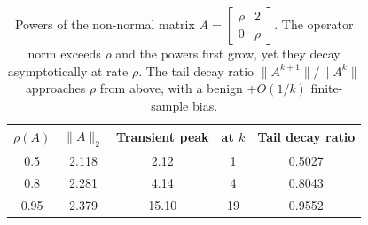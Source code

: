 \begin{table}[h]
\centering
\caption{Powers of the non-normal matrix $A = \left[\begin{smallmatrix} \rho & 2 \\ 0 & \rho \end{smallmatrix}\right]$. The operator norm exceeds $\rho$ and the powers first grow, yet they decay asymptotically at rate $\rho$. The tail decay ratio $\|A^{k+1}\|/\|A^k\|$ approaches $\rho$ from above, with a benign $+O(1/k)$ finite-sample bias.}
\label{tab:prelim_spectral_radius}
\begin{tabular}{ccccc}
\hline
$\rho(A)$ & $\|A\|_2$ & Transient peak & at $k$ & Tail decay ratio \\
\hline
0.5 & 2.118 & 2.12 & 1 & 0.5027 \\
0.8 & 2.281 & 4.14 & 4 & 0.8043 \\
0.95 & 2.379 & 15.10 & 19 & 0.9552 \\
\hline
\end{tabular}
\end{table}
